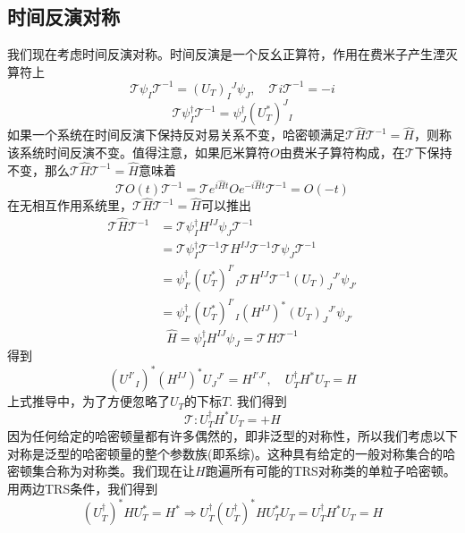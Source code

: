 \documentclass[a4paper]{article}
\numberwithin{equation}{subsection}
\newcommand{\mT}{\mathcal{T}}
\newcommand{\UT}{U_{T}}
\begin{document}
\subsection{时间反演对称}
我们现在考虑时间反演对称。时间反演是一个反幺正算符，作用在费米子产生湮灭算符上
\begin{equation}
    \mT\psi_I\mT^{-1}=(\UT)_I{}^J\psi_J,\quad \mT i\mT^{-1}=-i
\end{equation}
\begin{equation}
    \mT \psi_I^\dagger\mT^{-1}=\psi_J^\dagger(U_T^*)^J{}_{I}
\end{equation}
如果一个系统在时间反演下保持反对易关系不变，哈密顿满足$\mT \hat{H}\mT^{-1}=\hat{H}$，则称该系统时间反演不变。值得注意，如果厄米算符$O$由费米子算符构成，在$\mT$下保持不变，那么$\mT \hat{H}\mT^{-1}=\hat{H}$意味着
\begin{equation}
    \mT O(t)\mT^{-1}=\mT e^{i\hat{H}t}Oe^{-i\hat{H}t}\mT^{-1}=O(-t)
\end{equation}
在无相互作用系统里，$\mT \hat{H}\mT^{-1}=\hat{H}$可以推出
\begin{equation*}
    \begin{split}
        \mT \hat{H}\mT^{-1}&=\mT \psi_I^\dagger H^{IJ}\psi_J\mT^{-1}\\
        &=\mT\psi_I^\dagger\mT^{-1}\mT H^{IJ}\mT^{-1}\mT\psi_J\mT^{-1}\\
        &=\psi_{I'}^\dagger (U_T^*)^{I'}{}_{I}\mT H^{IJ}\mT^{-1}(U_T)_J{}^{J'}\psi_{J'}\\
        &=\psi_{I'}^\dagger(U_T^*)^{I'}{}_I (H^{IJ})^* (U_T)_{J}{}^{J'}\psi_{J'}
    \end{split}
\end{equation*}
\begin{equation}
    \hat{H}=\psi_I^\dagger H^{IJ}\psi_J=\mT H\mT^{-1}
\end{equation}
得到
\begin{equation}
    (U^{I'}{}_I)^*(H^{IJ})^*U_{J}{}^{J'}=H^{I'J'},\quad U_T^\dagger H^*U_T=H
\end{equation}
上式推导中，为了方便忽略了$U_T$的下标$T$. 我们得到
\begin{equation}
    \mT:U_T^\dagger H^* U_T=+H
\end{equation}
因为任何给定的哈密顿量都有许多偶然的，即非泛型的对称性，所以我们考虑以下对称是泛型的哈密顿量的整个参数族(即系综)。这种具有给定的一般对称集合的哈密顿集合称为对称类。我们现在让$H$跑遍所有可能的TRS对称类的单粒子哈密顿。用两边TRS条件，我们得到
\begin{equation}
    (U_T^\dagger)^* HU_T^*=H^*\Rightarrow U_T^\dagger (U_T^\dagger)^* HU_T^* U_T=U_T^\dagger H^* U_T=H
\end{equation}
\end{document}
